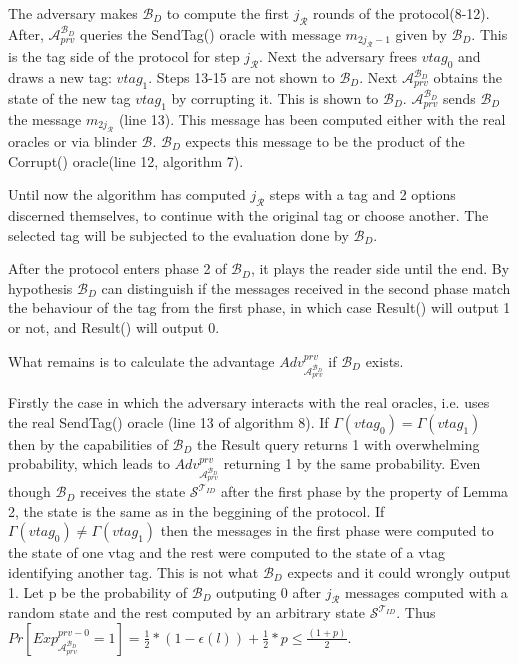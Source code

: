     The adversary makes $\mathcal{B}_D$ to compute the first $j_{\mathcal{R}}$ rounds of the protocol(8-12). After, $\mathcal{A}_{prv}^{\mathcal{B}_D}$ queries the 
    SendTag() oracle with message $m_{2j_{\mathcal{R}}-1}$ given by $\mathcal{B}_D$. This is the tag side of the protocol for step $j_{\mathcal{R}}$. Next the adversary
    frees $vtag_{0}$ and draws a new tag: $vtag_{1}$. Steps 13-15 are not shown to $\mathcal{B}_D$. Next $\mathcal{A}_{prv}^{\mathcal{B}_D}$ obtains the state of
    the new tag $vtag_{1}$ by corrupting it. This is shown to $\mathcal{B}_D$. $\mathcal{A}_{prv}^{\mathcal{B}_D}$ sends $\mathcal{B}_D$ the message $m_{2j_{\mathcal{R}}}$ 
    (line 13). This message has been computed either with the real oracles or via blinder $\mathcal{B}$. $\mathcal{B}_D$ expects this message to be the product of the Corrupt()
    oracle(line 12, algorithm 7).

    Until now the algorithm has computed $j_{\mathcal{R}}$ steps with a tag and 2 options discerned themselves, to continue with the original tag or choose another. The selected 
    tag will be subjected to the evaluation done by $\mathcal{B}_D$. 

    After the protocol enters phase 2 of $\mathcal{B}_D$, it plays the reader side until the end. By hypothesis $\mathcal{B}_D$ can distinguish if the messages received in the second
    phase match the behaviour of the tag from the first phase, in which case Result() will output 1 or not, and Result() will output 0. 
    
    What remains is to calculate the advantage $Adv_{\mathcal{A}_{prv}^{\mathcal{B}_D}}^{prv}$ if $\mathcal{B}_D$ exists.

    Firstly the case in which the adversary interacts with the real oracles, i.e. uses the real SendTag() oracle (line 13 of algorithm 8). If
    $\Gamma(vtag_0) = \Gamma(vtag_1)$ then by the capabilities of $\mathcal{B}_D$ the Result query returns 1 with overwhelming probability, which
    leads to $Adv_{\mathcal{A}_{prv}^{\mathcal{B}_D}}^{prv}$ returning 1 by the same probability. Even though $\mathcal{B}_D$ receives the state
    $\mathcal{S}^{\mathcal{T}_{ID}}$ after the first phase by the property of Lemma 2, the state is the same as in the beggining of the protocol.
    If $\Gamma(vtag_0) \neq \Gamma(vtag_1)$ then the messages in the first phase were computed to the state of one vtag and the rest were computed
    to the state of a vtag identifying another tag. This is not what $\mathcal{B}_D$ expects and it could wrongly output 1. Let p be the probability
    of $\mathcal{B}_D$ outputing 0 after $j_\mathcal{R}$ messages computed with a random state and the rest computed by an arbitrary state 
    $\mathcal{S}^{\mathcal{T}_{ID}}$. Thus $Pr[Exp_{\mathcal{A}_{prv}^{\mathcal{B}_D}}^{prv-0} = 1] = \frac{1}{2}*(1-\epsilon(l))
    +\frac{1}{2}*p \leq \frac{(1+p)}{2}.$

